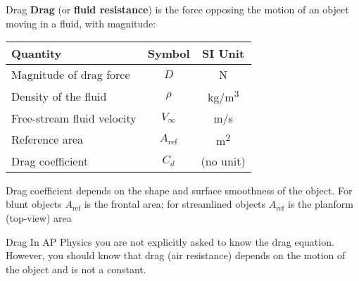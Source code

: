 \documentclass[12pt,compress,aspectratio=169]{beamer}
\newcommand{\eq}[2]{\vspace{#1}{\Large\begin{displaymath}#2\end{displaymath}}}
\begin{document}
\begin{frame}{Drag}
  \textbf{Drag} (or \textbf{fluid resistance}) is the force opposing the
  motion of an object moving in a fluid, with magnitude:

  \eq{-.2in}{
    D=\frac{1}{2}\rho V_\infty^2A_\mathrm{ref}C_d
  }  
  \begin{center}
    \begin{tabular}{l|c|c}
      \rowcolor{pink}
      \textbf{Quantity} & \textbf{Symbol} & \textbf{SI Unit} \\ \hline
      Magnitude of drag force & $D$  & \si{\newton}\\
      Density of the fluid & $\rho$ & \si{\kg/\m^3}\\
      Free-stream fluid velocity & $V_\infty$ & \si{\m/\s}\\
      Reference area   & $A_\mathrm{ref}$ & \si{m^2}\\
      Drag coefficient & $C_d$ & (no unit)
    \end{tabular}
  \end{center}
  {\footnotesize Drag coefficient depends on the shape and surface smoothness
    of the object. For blunt objects $A_\mathrm{ref}$ is the frontal area; for
    streamlined objects $A_\mathrm{ref}$ is the planform (top-view) area\par}
\end{frame}



\begin{frame}{Drag}
  In AP Physics you are not explicitly asked to know the drag equation.
  However, you should know that drag (air resistance) depends on the motion of
  the object and is not a constant.
\end{frame}
\end{document}
